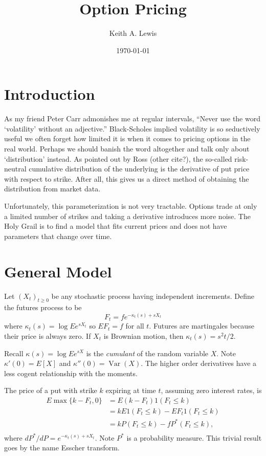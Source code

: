 \documentclass[fleqn]{amsart}
\title{Option Pricing}
\author{Keith A. Lewis}
\date{\today}
\providecommand{\Var}{\mathop{\mathrm{Var}}}
\begin{document}
\address{KALX, LLC \tt{\url{http://kalx.net}}}

\maketitle

\section{Introduction}
As my friend Peter Carr admonishes me at regular intervals, ``Never use
the word `volatility' without an adjective.'' Black-Scholes implied
volatility is so seductively useful we often forget how limited it
is when it comes to pricing options in the real world.
Perhaps we should banish the word altogether and talk only about
`distribution' instead. As pointed out by Ross (other cite?), the so-called
risk-neutral cumulative distribution of the underlying is the 
derivative of put price with respect to strike. After all, this
gives us a direct method of obtaining the distribution from market
data.

Unfortunately, this parameterization is not very tractable. Options
trade at only a limited number of strikes and taking a derivative
introduces more noise. The Holy Grail is to find a model
that fits current prices and does not have parameters that
change over time. 

\section{General Model}
Let \((X_t)_{t\ge0}\) be any stochastic process having independent
increments. Define the
futures process to be
\[
	F_t = f e^{-\kappa_t(s) + s X_t}
\]
where \(\kappa_t(s) = \log E e^{s X_t}\) so \(E F_t = f\) for all \(t\).
Futures are martingales because their price is always zero.
If \(X_t\) is Brownian motion, then \(\kappa_t(s) = s^2t/2.\)

Recall \(\kappa(s) = \log E e^{sX}\) is the {\em cumulant} of the
random variable \(X\). Note \(\kappa'(0) = E[X]\) and \(\kappa''(0) =
\Var(X)\). The higher order derivatives have a less cogent relationship
with the moments.

The price of a put with strike $k$ expiring at time $t$, assuming zero
interest rates, is
\begin{align*}
E\max\{k - F_t, 0\} &= E(k - F_t)1(F_t \le k) \\
&= kE1(F_t \le k) - E F_t1(F_t \le k)\\
&= kP(F_t \le k) - f P^*(F_t \le k),\\
\end{align*}
where \(dP^*/dP = e^{-\kappa_t(s) + s X_t}\).
Note \(P^*\) is a probability measure. This trivial result
goes by the name Esscher transform.
\end{document}
